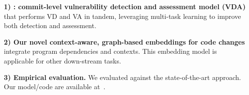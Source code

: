 {\bf 1) {\tool}: commit-level vulnerability detection and assessment
  model (VDA)} that performs VD and VA in tandem, leveraging multi-task
learning to improve both detection and assessment.


{\bf 2) Our novel context-aware, graph-based embeddings for code
  changes}
integrate program dependencies and contexts. This embedding model
is applicable for other down-stream tasks.


{\bf 3) Empirical evaluation.} We evaluated {\tool}
against the state-of-the-art approach.
Our model/code are available at~\cite{cat-website}.

